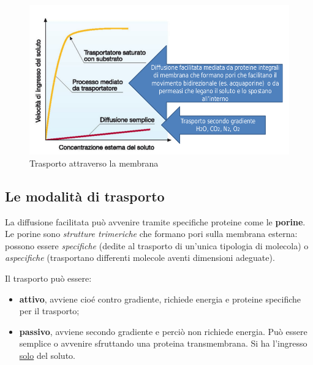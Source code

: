 \documentclass[11pt]{book}
\begin{document}
\begin{figure}[htp]
\centering
\includegraphics[scale=0.35]{img/Trasporto attraverso la membrana.png}
\caption{Trasporto attraverso la membrana}
\label{}
\end{figure}


\subsection{Le modalità di trasporto}
La diffusione facilitata può avvenire tramite specifiche proteine come le \textbf{porine}. Le porine sono \emph{strutture trimeriche} che formano pori sulla membrana esterna: possono essere \emph{specifiche} (dedite al trasporto di un’unica tipologia di molecola) o \emph{aspecifiche} (trasportano differenti molecole aventi dimensioni adeguate).

\vspace{1em}
Il trasporto può essere:
\begin{itemize}
\item \textbf{attivo}, avviene cioé contro gradiente, richiede energia e proteine specifiche per il trasporto;
\item \textbf{passivo}, avviene secondo gradiente e perciò non richiede energia. Può essere semplice o avvenire sfruttando una proteina transmembrana. Si ha l'ingresso \underline{solo} del soluto.
\end{itemize}
\end{document}
